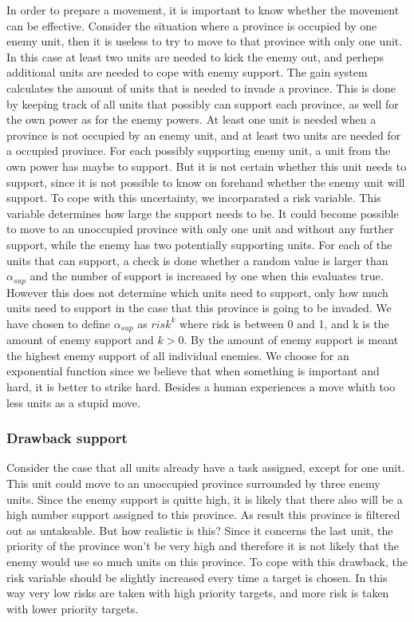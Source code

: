 \documentclass[a4paper]{article} %
\begin{document}
In order to prepare a movement, it is important to know whether the movement can be effective. Consider the situation where a province is occupied by one enemy unit, then it is useless to try to move to that province with only one unit. In this case at least two units are needed to kick the enemy out, and perheps additional units are needed to cope with enemy support. The gain system calculates the amount of units that is needed to invade a province. This is done by keeping track of all units that possibly can support each province, as well for the own power as for the enemy powers. At least one unit is needed when a province is not occupied by an enemy unit, and at least two units are needed for a occupied province. For each possibly supporting enemy unit, a unit from the own power has maybe to support. But it is not certain whether this unit needs to support, since it is not possible to know on forehand whether the enemy unit will support. To cope with this uncertainty, we incorparated a risk variable. This variable determines how large the support needs to be. It could become possible to move to an unoccupied province with only one unit and without any further support, while the enemy has two potentially supporting units. For each of the units that can support, a check is done whether a random value is larger than $\alpha_{sup}$ and the number of support is increased by one when this evaluates true. However this does not determine which units need to support, only how much units need to support in the case that this province is going to be invaded. We have chosen to define $\alpha_{sup}$ as $risk^{k}$ where risk is between 0 and 1, and k is the amount of enemy support and $k>0$. By the amount of enemy support is meant the highest enemy support of all individual enemies. We choose for an exponential function since we believe that when something is important and hard, it is better to strike hard. Besides a human experiences a move whith too less units as a stupid move. 

\subsubsection{Drawback support}
Consider the case that all units already have a task assigned, except for one unit. This unit could move to an unoccupied province surrounded by three enemy units. Since the enemy support is quitte high, it is likely that there also will be a high number support assigned to this province. As result this province is filtered out as untakeable. But how realistic is this? Since it concerns the last unit, the priority of the province won't be very high and therefore it is not likely that the enemy would use so much units on this province. To cope with this drawback, the risk variable should be slightly increased every time a target is chosen. In this way very low risks are taken with high priority targets, and more risk is taken with lower priority targets. 
\end{document}
